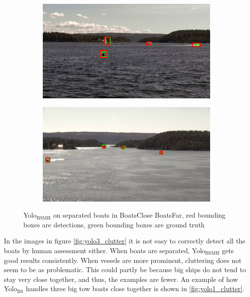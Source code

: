 \begin{figure}[h!]
\begin{subfigure}{.5\textwidth}
  \centering
  \includegraphics[width=0.8\linewidth]{discussion/good_ex/selected_08_14_frame1140.jpg}
\end{subfigure}%
\begin{subfigure}{.5\textwidth}
  \centering
  \includegraphics[width=.8\linewidth]{discussion/good_ex/selected_08_11_frame1380.jpg}
\end{subfigure}
\caption{Yolo$_{\text{BSMH}}$ on separated boats in BoatsClose BoatsFar, red bounding boxes are detections, green bounding boxes are ground truth}
\label{fig:yolo3_good_ex}
\end{figure}

In the images in figure \ref{fig:yolo3_clutter} it is not easy to correctly detect all the boats by human assessment either. When boats are separated, Yolo$_{\text{BSMH}}$ gets good results consistently. When vessels are more prominent, cluttering does not seem to be as problematic. This could partly be because big ships do not tend to stay very close together, and thus, the examples are fewer. An example of how Yolo$_{\text{BS}}$ handles three big tow boats close together is shown in \ref{fig:yolo1_clutter}.


